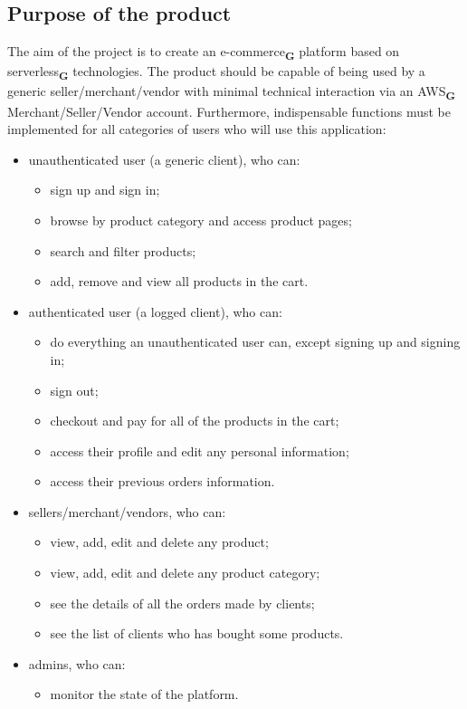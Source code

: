 \subsection{Purpose of the product}
The aim of the project is to create an e-commerce\textsubscript{\textbf{G}} platform based on serverless\textsubscript{\textbf{G}} technologies.
The product should be capable of being used by a generic seller/merchant/vendor with minimal technical interaction
via an AWS\textsubscript{\textbf{G}} Merchant/Seller/Vendor account.
Furthermore, indispensable functions must be implemented for all categories of users who will use this application:
\begin{itemize}
    \item unauthenticated user (a generic client), who can:
          \begin{itemize}
              \item sign up and sign in;
              \item browse by product category and access product pages;
              \item search and filter products;
              \item add, remove and view all products in the cart.
          \end{itemize}
    \item authenticated user (a logged client), who can:
          \begin{itemize}
              \item do everything an unauthenticated user can, except signing up and signing in;
              \item sign out;
              \item checkout and pay for all of the products in the cart;
              \item access their profile and edit any personal information;
              \item access their previous orders information.
          \end{itemize}
    \item sellers/merchant/vendors, who can:
          \begin{itemize}
              \item view, add, edit and delete any product;
              \item view, add, edit and delete any product category;
              \item see the details of all the orders made by clients;
              \item see the list of clients who has bought some products.
          \end{itemize}
    \item admins, who can:
          \begin{itemize}
              \item monitor the state of the platform.
          \end{itemize}
\end{itemize}
